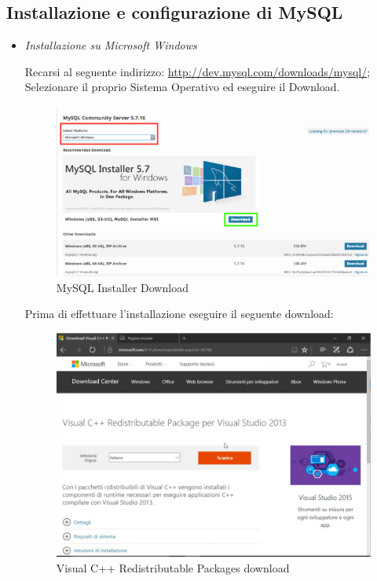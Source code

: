 \subsection{Installazione e configurazione di MySQL} 

\begin{itemize}

\item{\textit{Installazione su Microsoft Windows}}

Recarsi al seguente indirizzo: \url{http://dev.mysql.com/downloads/mysql/}; Selezionare il proprio Sistema Operativo ed eseguire il Download.

\begin{center}
\begin{figure}[H]
\centering
\includegraphics[scale=0.8]{figures/mySQLinstaller.png}
\caption{MySQL Installer Download}
\end{figure}
\end{center}

Prima di effettuare l’installazione eseguire il seguente download:

\begin{center}
\begin{figure}[H]
\centering
\includegraphics[scale=0.8]{figures/visualc++.png}
\caption{Visual C++ Redistributable Packages download}
\end{figure}
\end{center}


\end{itemize}
